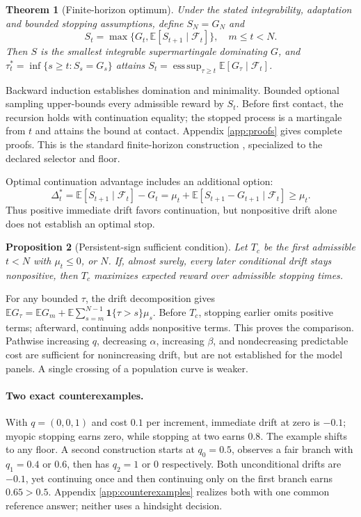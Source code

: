 \documentclass{article}
\newtheorem{theorem}{Theorem}
\newtheorem{proposition}[theorem]{Proposition}
\newcommand{\E}{\mathbb E}
\newcommand{\F}{\mathcal F}
\newcommand{\ind}{\mathbf 1}
\newcommand{\esssup}{\operatorname*{ess\,sup}}
\begin{document}
\begin{theorem}[Finite-horizon optimum]
\label{thm:snell}
Under the stated integrability, adaptation and bounded stopping assumptions,
define \(S_N=G_N\) and
\begin{equation}
 S_t=\max\{G_t,\E[S_{t+1}\mid\F_t]\},\quad m\le t<N.
 \label{eq:snell}
\end{equation}
Then \(S\) is the smallest integrable supermartingale dominating \(G\), and
\(\tau_t^*=\inf\{s\ge t:S_s=G_s\}\) attains
\(S_t=\esssup_{\tau\ge t}\E[G_\tau\mid\F_t]\).
\end{theorem}
\noindent
Backward induction establishes domination and minimality. Bounded optional
sampling upper-bounds every admissible reward by \(S_t\). Before first contact,
the recursion holds with continuation equality; the stopped process is a
martingale from \(t\) and attains the bound at contact. Appendix
\ref{app:proofs} gives complete proofs. This is the standard finite-horizon
construction \citep{ferguson,peskir2006}, specialized to the declared selector
and floor.

Optimal continuation advantage includes an additional option:
\begin{equation}
 \Delta_t^*=\E[S_{t+1}\mid\F_t]-G_t
 =\mu_t+\E[S_{t+1}-G_{t+1}\mid\F_t]\ge\mu_t.
 \label{eq:option}
\end{equation}
Thus positive immediate drift favors continuation, but nonpositive drift alone
does not establish an optimal stop.

\begin{proposition}[Persistent-sign sufficient condition]
\label{prop:persistence}
Let \(T_c\) be the first admissible \(t<N\) with \(\mu_t\le0\), or \(N\).
If, almost surely, every later conditional drift stays nonpositive, then
\(T_c\) maximizes expected reward over admissible stopping times.
\end{proposition}
\noindent
For any bounded \(\tau\), the drift decomposition gives
\(\E G_\tau=\E G_m+\E\sum_{s=m}^{N-1}\ind\{\tau>s\}\mu_s\).
Before \(T_c\), stopping earlier omits positive terms; afterward, continuing
adds nonpositive terms. This proves the comparison. Pathwise increasing \(q\),
decreasing \(\alpha\), increasing \(\beta\), and nondecreasing predictable cost
are sufficient for nonincreasing drift, but are not established for the model
panels. A single crossing of a population curve is weaker.

\paragraph{Two exact counterexamples.}
With \(q=(0,0,1)\) and cost \(0.1\) per increment, immediate drift at zero is
\(-0.1\); myopic stopping earns zero, while stopping at two earns \(0.8\).
The example shifts to any floor. A second construction starts at \(q_0=0.5\),
observes a fair branch with \(q_1=0.4\) or \(0.6\), then has \(q_2=1\) or \(0\)
respectively. Both unconditional drifts are \(-0.1\), yet continuing once and
then continuing only on the first branch earns \(0.65>0.5\). Appendix
\ref{app:counterexamples} realizes both with one common reference answer;
neither uses a hindsight decision.
\end{document}
